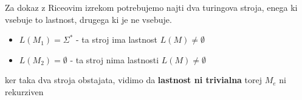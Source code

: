 \documentclass[a4paper]{article}
\begin{document}
\begin{multicols}{2}
Za dokaz z Riceovim izrekom potrebujemo najti dva turingova stroja, enega ki vsebuje to lastnost, drugega ki je ne vsebuje.
\begin{itemize}
\item $L(M_1) = \Sigma^*$ - ta stroj ima lastnost $ L(M) \neq \emptyset $
\item $L(M_2) = \emptyset $ - ta stroj nima lastnosti $ L(M) \neq \emptyset $
\end{itemize}
ker taka dva stroja obstajata, vidimo da \textbf{lastnost ni trivialna} torej $M_e$ ni rekurziven

\end{multicols}
\end{document}
